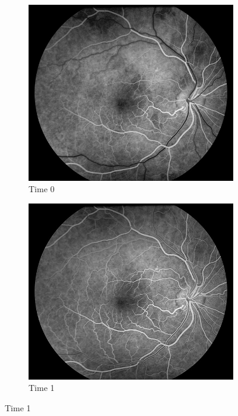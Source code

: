 \begin{figure}[H]
  \centering
	\begin{subfigure}[b]{0.23\textwidth}
        \includegraphics[width=1\textwidth]{./Figures/FA_Fig1.jpg}
        \caption{Time 0}
        \label{fig:af1}
    \end{subfigure}
	\begin{subfigure}[b]{0.23\textwidth}
        \includegraphics[width=1\textwidth]{./Figures/FA_Fig2.jpg}
        \caption{Time 1}
        \label{fig:af2}

\end{subfigure}
\end{figure}
